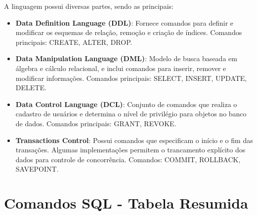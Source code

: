 \documentclass[12pt,a4paper]{article}
\begin{document}
A linguagem possui diversas partes, sendo as principais:

\begin{itemize}
    \item \textbf{Data Definition Language (DDL)}: Fornece comandos para definir e modificar os esquemas de relação, remoção e criação de índices. Comandos principais: CREATE, ALTER, DROP.
    
    \item \textbf{Data Manipulation Language (DML)}: Modelo de busca baseada em álgebra e cálculo relacional, e inclui comandos para inserir, remover e modificar informações. Comandos principais: SELECT, INSERT, UPDATE, DELETE.
    
    \item \textbf{Data Control Language (DCL)}: Conjunto de comandos que realiza o cadastro de usuários e determina o nível de privilégio para objetos no banco de dados. Comandos principais: GRANT, REVOKE.
    
    \item \textbf{Transactions Control}: Possui comandos que especificam o início e o fim das transações. Algumas implementações permitem o trancamento explícito dos dados para controle de concorrência. Comandos: COMMIT, ROLLBACK, SAVEPOINT.
\end{itemize}

\section*{Comandos SQL - Tabela Resumida}
\end{document}
